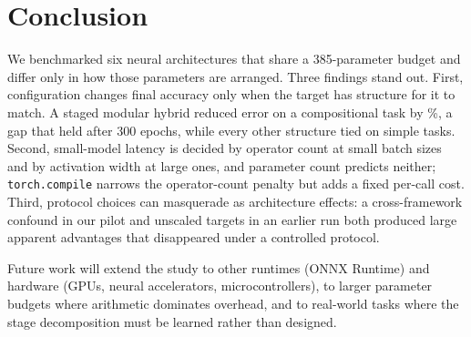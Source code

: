 \section{Conclusion}
\label{sec:conclusion}

We benchmarked six neural architectures that share a 385-parameter budget and differ only in how those parameters
are arranged. Three findings stand out. First, configuration changes final accuracy only when the target has
structure for it to match. A staged modular hybrid reduced error on a compositional task by \chainHBGain\%, a gap that
held after 300 epochs, while every other structure tied on simple tasks. Second, small-model latency is decided by
operator count at small batch sizes and by activation width at large ones, and parameter count predicts neither;
\texttt{torch.compile} narrows the operator-count penalty but adds a fixed per-call cost. Third, protocol choices can
masquerade as architecture effects: a cross-framework confound in our pilot and unscaled targets in an earlier run
both produced large apparent advantages that disappeared under a controlled protocol.

Future work will extend the study to other runtimes (ONNX Runtime) and hardware (GPUs, neural accelerators,
microcontrollers), to larger parameter budgets where arithmetic dominates overhead, and to real-world tasks where
the stage decomposition must be learned rather than designed.
